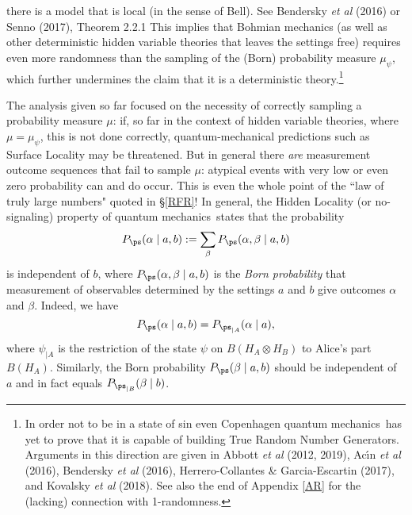 \documentclass[12pt]{article}
\numberwithin{equation}{section}
\newcommand{\qm}{quantum mechanics}
\newcommand{\ot}{\otimes}
\newcommand{\al}{\alpha} \newcommand{\bt}{L\beta}
\begin{document}
there is a model that is local (in the sense of Bell).
 See  Bendersky \emph{et al} (2016) or Senno (2017), Theorem 2.2.1
This  implies that Bohmian mechanics (as well as  other deterministic hidden variable theories that leaves the settings free) requires even more randomness than the sampling of the (Born) probability measure $\mu_{\psi}$, which further undermines the claim that it is a  deterministic theory.\footnote{\label{fnqrng} In order not to be in a state of sin even Copenhagen \qm\ has yet to prove that it is capable of building True Random Number Generators. Arguments in this direction are given in Abbott \emph{et al} (2012, 2019),  
 Ac\'{\i}n  \emph{et al} (2016), Bendersky  \emph{et al} (2016), Herrero-Collantes \& Garcia-Escartin (2017), and Kovalsky \emph{et al} (2018). See also the end of Appendix \ref{AR} for the (lacking) connection with 1-randomness.}
 
  The analysis given so far focused on the necessity of correctly sampling a probability measure $\mu$: if, so far in the context of hidden variable theories, where $\mu=\mu_{\psi}$, this is not done correctly, quantum-mechanical predictions such as Surface Locality may be threatened. But in general there \emph{are} measurement outcome sequences that fail to sample $\mu$:  atypical events with very low  or even zero probability can and do occur. This is even the whole point of the ``law of truly large numbers" quoted in \S\ref{RFR}!
 In general, the Hidden Locality (or no-signaling) property of \qm\ states that the probability
\begin{equation}
P_{\ps}(\al\mid a,b):= \sum_\beta P_{\ps}(\al, \beta\mid a, b) \label{NS}
\end{equation}
is independent of $b$, where $P_{\ps}(\al, \beta\mid a, b)$
is the \emph{Born probability} that measurement of observables determined by the settings $a$ and $b$ give outcomes $\al$ and $\beta$. Indeed, we have
\begin{equation}
P_{\ps}(\al\mid a,b)=P_{\ps_{|A}}(\al\mid a),
\end{equation}
where $\psi_{|A}$ is the restriction of the state $\psi$ on $B(H_A\ot H_B)$ to Alice's part $B(H_A)$. Similarly, the Born probability
$P_{\ps}(\beta\mid a,b)$ should be independent of $a$ and in fact equals $P_{\ps_{|B}}(\beta\mid b)$.
\end{document}

